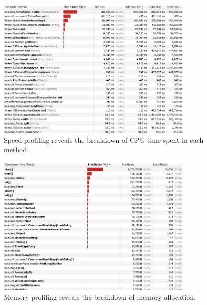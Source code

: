 \documentclass[a4paper, 11pt, titlepage]{report}
\begin{document}
\begin{appendices}
\begin{figure}[H]
	\centering
	\includegraphics[width=0.85\textwidth]{figures/Speed-profiling.png}
	\caption{Speed profiling reveals the breakdown of CPU time spent in each method.}
	\label{fig:speed-profiling}
\end{figure}

\begin{figure}[H]
	\centering
	\includegraphics[width=0.85\textwidth]{figures/Memory-profiling.png}
	\caption{Memory profiling reveals the breakdown of memory allocation.}
	\label{fig:speed-profiling}
\end{figure}

\end{appendices}

\renewcommand{\bibname}{References}

  
\end{document}

